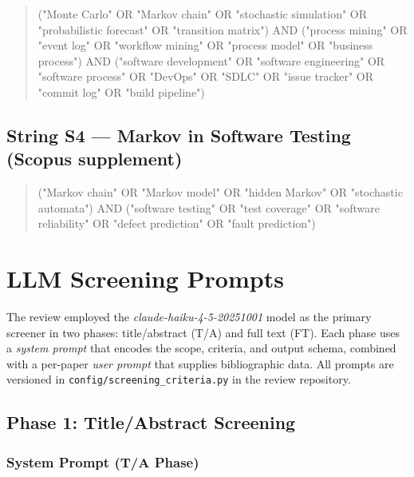 \begin{quote}
\small\ttfamily
("Monte Carlo" OR "Markov chain" OR "stochastic simulation" OR
"probabilistic forecast" OR "transition matrix") AND ("process mining" OR
"event log" OR "workflow mining" OR "process model" OR "business process") AND
("software development" OR "software engineering" OR "software process" OR
"DevOps" OR "SDLC" OR "issue tracker" OR "commit log" OR "build pipeline")
\end{quote}

\section{String S4 --- Markov in Software Testing (Scopus supplement)}
\label{app:slr-s4}

\begin{quote}
\small\ttfamily
("Markov chain" OR "Markov model" OR "hidden Markov" OR "stochastic automata")
AND ("software testing" OR "test coverage" OR "software reliability" OR
"defect prediction" OR "fault prediction")
\end{quote}


\chapter{LLM Screening Prompts}
\label{app:F}

The review employed the \textit{claude-haiku-4-5-20251001} model as the
primary screener in two phases: title/abstract (T/A) and full text (FT).
Each phase uses a \emph{system prompt} that encodes the scope, criteria, and
output schema, combined with a per-paper \emph{user prompt} that supplies
bibliographic data. All prompts are versioned in
\texttt{config/screening\_criteria.py} in the review repository.

\section{Phase 1: Title/Abstract Screening}
\label{app:slr-ta-prompt}

\subsection*{System Prompt (T/A Phase)}

